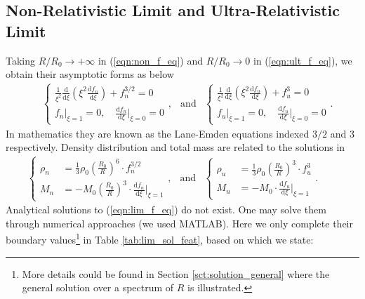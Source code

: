 \documentclass[a4paper,11pt]{article}
\newcommand{\mathdd}{\mathrm{d}}
\numberwithin{equation}{section}
\numberwithin{table}{section}
\numberwithin{figure}{section}
\begin{document}
		\subsection{Non-Relativistic Limit and Ultra-Relativistic Limit}
			Taking $R/R_0\rightarrow+\infty$ in (\ref{eqn:non_f_eq}) and $R/R_0\rightarrow 0$ in (\ref{eqn:ult_f_eq}), we obtain their asymptotic forms as below
			\begin{eqnarray}
				\quad\left\{\begin{gathered}
					\frac{1}{\xi^2}\frac{\mathdd}{\mathdd\xi}
						\left(\xi^2\frac{\mathdd f_n}{\mathdd\xi}\right)
						+f_n^{3/2}=0 \\
					f_n\bigg|_{\xi=1}=0,\quad
						\frac{\mathdd f_n}{\mathdd\xi}\bigg|_{\xi=0}=0
				\end{gathered}\right.,
				&\textrm{and}&
				\left\{\begin{gathered}
					\frac{1}{\xi^2}\frac{\mathdd}{\mathdd\xi}
						\left(\xi^2\frac{\mathdd f_u}{\mathdd\xi}\right)
						+f_u^3=0 \\
					f_u\bigg|_{\xi=1}=0,\quad
						\frac{\mathdd f_u}{\mathdd\xi}\bigg|_{\xi=0}=0
				\end{gathered}\right. .
				\label{eqn:lim_f_eq}
			\end{eqnarray}
			In mathematics they are known as the Lane-Emden equations indexed $3/2$ and $3$ respectively. Density distribution and total mass are related to the solutions in
			\begin{eqnarray}
				\left\{\begin{aligned}
					\rho_n&=\frac{1}{3}\rho_0\left(\frac{R_0}{R}\right)^6
						\cdot f_n^{3/2} \\
					M_n&=-M_0\left(\frac{R_0}{R}\right)^3
						\cdot\frac{\mathdd f_n}{\mathdd\xi}\bigg|_{\xi=1}
				\end{aligned}\right.,
				&\textrm{and}&
				\left\{\begin{aligned}
					\rho_u&=\frac{1}{3}\rho_0\left(\frac{R_0}{R}\right)^3
						\cdot f_u^3 \\
					M_u&=-M_0\cdot\frac{\mathdd f_u}{\mathdd\xi}\bigg|_{\xi=1}
				\end{aligned}\right. .\quad\quad
				\label{eqn:lim_constraint}
			\end{eqnarray}
			Analytical solutions to (\ref{eqn:lim_f_eq}) do not exist. One may solve them through numerical approaches (we used MATLAB). Here we only complete their boundary values\footnote{More details could be found in Section \ref{sct:solution_general}	where the general solution over a spectrum of $R$ is illustrated.} in Table \ref{tab:lim_sol_feat}, based on which we state: 
\end{document}
